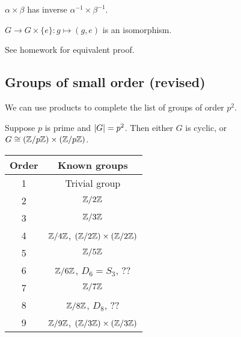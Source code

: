 \documentclass[12pt,letterpaper]{report}
\begin{document}
\begin{thmproof}
  $\alpha \times \beta$ has inverse $\alpha^{-1} \times \beta^{-1}$.
\end{thmproof}

\begin{prop}{}{}
  $G \to G \times \{e\} : g \mapsto (g, e)$ is an isomorphism.
\end{prop}

\begin{thmproof}
  See homework for equivalent proof.
\end{thmproof}

\pagebreak
\subsection{Groups of small order (revised)}

We can use products to complete the list of groups of order $p^2$.

\begin{prop}{}{}
  Suppose $p$ is prime and $\lvert G\rvert = p^2$.
  Then either $G$ is cyclic, or $G \cong (\mathbb{Z}/{p}\mathbb{Z}) \times (\mathbb{Z}/{p}\mathbb{Z})$.
\end{prop}

\begin{thmproof}

\end{thmproof}

\begin{center}
  \renewcommand{\arraystretch}{1.2}
  \begin{tabular}{c | c}
    Order & Known groups \\
    \hline
    1 & Trivial group \\
    2 & $\mathbb{Z}/{2}\mathbb{Z}$ \\
    3 & $\mathbb{Z}/{3}\mathbb{Z}$ \\
    4 & $\mathbb{Z}/{4}\mathbb{Z}$, $(\mathbb{Z}/{2}\mathbb{Z}) \times (\mathbb{Z}/{2}\mathbb{Z})$ \\
    5 & $\mathbb{Z}/{5}\mathbb{Z}$ \\
    6 & $\mathbb{Z}/{6}\mathbb{Z}$, $D_6 = S_3$, ?? \\
    7 & $\mathbb{Z}/{7}\mathbb{Z}$ \\
    8 & $\mathbb{Z}/{8}\mathbb{Z}$, $D_8$, ?? \\
    9 & $\mathbb{Z}/{9}\mathbb{Z}$, $(\mathbb{Z}/{3}\mathbb{Z}) \times (\mathbb{Z}/{3}\mathbb{Z})$
  \end{tabular}
\end{center}
\end{document}
